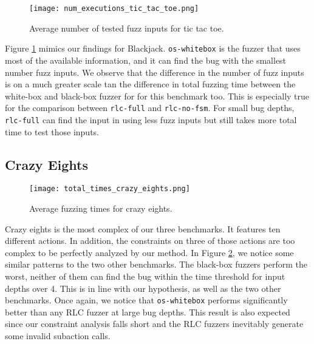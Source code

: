 \begin{figure}[h]
    \centering
    \texttt{[image: num\_executions\_tic\_tac\_toe.png]}
    \caption{Average number of tested fuzz inputs for tic tac toe.}
    \label{avgInputsTicTacToe}
\end{figure}

Figure \ref{avgInputsTicTacToe} mimics our findings for Blackjack.
\texttt{os-whitebox} is the fuzzer that uses most of the available information, and it can find the bug with the smallest number fuzz inputs.
We observe that the difference in the number of fuzz inputs is on a much greater scale tan the difference in total fuzzing time between the white-box and black-box fuzzer for for this benchmark too.
This is especially true for the comparison between \texttt{rlc-full} and \texttt{rlc-no-fsm}.
For small bug depths, \texttt{rlc-full} can find the input in using less fuzz inputs but still takes more total time to test those inputs.

\subsection{Crazy Eights}
\begin{figure}[h]
    \centering
    \texttt{[image: total\_times\_crazy\_eights.png]}
    \caption{Average fuzzing times for crazy eights.}
    \label{totalTimesCrazyEights}
\end{figure}

Crazy eights is the most complex of our three benchmarks.
It features ten different actions. In addition, the constraints on three of those actions are too complex to be perfectly analyzed by our method.
In Figure \ref{totalTimesCrazyEights}, we notice some similar patterns to the two other benchmarks.
The black-box fuzzers perform the worst, neither of them can find the bug within the time threshold for input depths over 4.
This is in line with our hypothesis, as well as the two other benchmarks.
Once again, we notice that \texttt{os-whitebox} performs significantly better than any RLC fuzzer at large bug depths.
This result is also expected since our constraint analysis falls short and the RLC fuzzers inevitably generate some invalid subaction calls.

